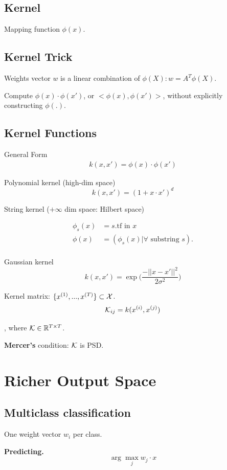 \documentclass[a4paper]{report}
\begin{document}
\section{Kernel}
Mapping function $\phi(x)$. 
\section{Kernel Trick}
Weights vector $w$ is a linear combination of $\phi(X): w=A^T\phi(X)$.

Compute $\phi(x)\cdot \phi(x')$, or $<\phi(x), \phi(x')>$, without explicitly constructing $\phi(.)$. 

\section{Kernel Functions}
General Form 
\begin{align*}
k(x, x') = \phi(x)\cdot\phi(x')
\end{align*}

Polynomial kernel (high-dim space)
$$
k(x, x')=(1+x\cdot x')^d
$$

String kernel ($+\infty$ dim space: Hilbert space)

\begin{align*}
\phi_s(x)&= s.\text{tf in } x\\
\phi(x) &= (\phi_s(x)|\forall \text{ substring } s). \\
\end{align*}

Gaussian kernel
$$
k(x, x') = \exp\Big(\frac{-||x-x'||^2}{2\sigma^2}\Big)
$$


Kernel matrix: $\{x^{(1)},...,x^{(T)}\}\subset \mathcal{X}$. 
$$
\mathcal{K}_{ij} = k(x^{(i)}, x^{(j)}) 
$$

, where $\mathcal{K}\in \mathbb{R}^{T\times T}$.

\textbf{Mercer's} condition: $\mathcal{K}$ is PSD.

\chapter{Richer Output Space} 
\section{Multiclass classification}
One weight vector $w_i$ per class. 

\textbf{Predicting.} 
$$
\arg\max_j w_j \cdot x
$$
\end{document}
